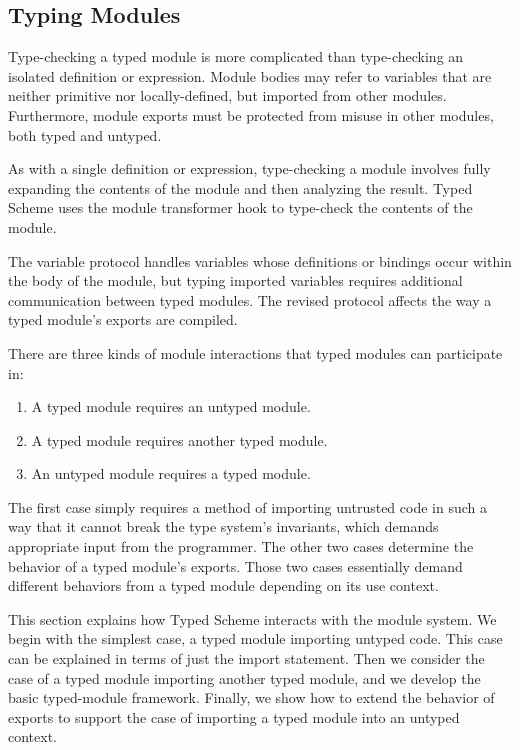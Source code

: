 \newcommand\Strust{\textsc{trust}}

\begin{schemeregion}
\section{Typing Modules}
\label{sect:type-multi}

Type-checking a typed module is more complicated than type-checking an
isolated definition or expression. Module bodies may refer to
variables that are neither primitive nor locally-defined, but imported
from other modules. Furthermore, module exports must be protected from
misuse in other modules, both typed and untyped.

As with a single definition or expression, type-checking a module
involves fully expanding the contents of the module and then analyzing
the result. Typed Scheme uses the module transformer hook
to type-check the contents of the module.

The variable protocol handles variables whose definitions or bindings
occur within the body of the module, but typing imported variables
requires additional communication between typed modules. The revised
protocol affects the way a typed module's exports are compiled.

There are three kinds of module interactions that typed modules can
participate in:
\begin{enumerate}
\item A typed module requires an untyped module.
\item A typed module requires another typed module.
\item An untyped module requires a typed module.
\end{enumerate}
The first case simply requires a method of importing untrusted code in
such a way that it cannot break the type system's invariants, which
demands appropriate input from the programmer.  The other two cases
determine the behavior of a typed module's exports. Those two cases
essentially demand different behaviors from a typed module depending
on its use context.

This section explains how Typed Scheme interacts with the module
system. We begin with the simplest case, a typed module importing
untyped code. This case can be explained in terms of just the import
statement. Then we consider the case of a typed module importing
another typed module, and we develop the basic typed-module framework.
Finally, we show how to extend the behavior of exports to support the
case of importing a typed module into an untyped context.


\end{schemeregion}
